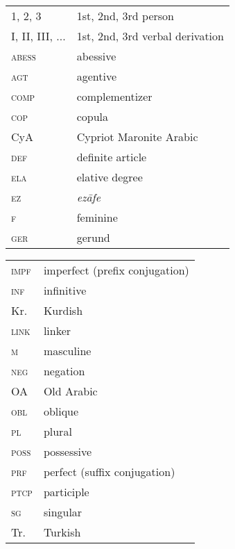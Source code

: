 \documentclass[output=paper]{langsci/langscibook}
\begin{document}
\begin{tabularx}{.5\textwidth}{@{}lQ@{}}
\textsc{1, 2, 3} & 1st, 2nd, 3rd person \\
\textsc{I, II, III, ...} & 1st, 2nd, 3rd verbal derivation \\
\textsc{abess} & abessive \\
\textsc{agt} & agentive \\
\textsc{comp} & complementizer \\
\textsc{cop} & copula \\
CyA & Cypriot Maronite Arabic \\
\textsc{def} & definite article \\
\textsc{ela} & elative degree \\
\textsc{ez} & \textit{ezāfe} \\
\textsc{f} & feminine \\
\textsc{ger} & gerund \\
\end{tabularx}%
\begin{tabularx}{.5\textwidth}{@{}lQ@{}}
\textsc{impf} & imperfect (prefix conjugation) \\
\textsc{inf} & infinitive \\
Kr. & Kurdish \\
\textsc{link} & linker \\
\textsc{m} & masculine \\
\textsc{neg} & negation  \\
OA & Old Arabic \\
\textsc{obl} & oblique \\
\textsc{pl} & plural \\
\textsc{poss} & possessive  \\
\textsc{prf} & perfect (suffix conjugation) \\
\textsc{ptcp} & participle \\
\textsc{sg} & singular \\
Tr. & Turkish \\
\end{tabularx}%

{\sloppy\printbibliography[heading=subbibliography,notkeyword=this]}
\end{document}
